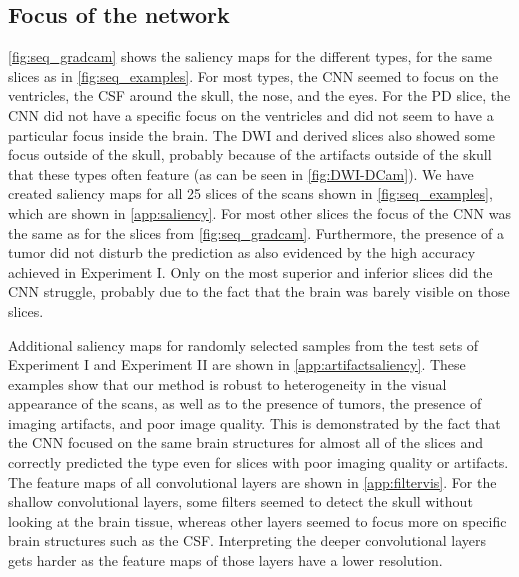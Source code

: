 \subsection{Focus of the network}
\cref{fig:seq_gradcam} shows the saliency maps for the different \glspl{type}, for the same \glspl{slice} as in \cref{fig:seq_examples}.
For most \glspl{type}, the \gls{CNN} seemed to focus on the ventricles, the \gls{CSF} around the skull, the nose, and the eyes.
For the \gls{PD} \gls{slice}, the \gls{CNN} did not have a specific focus on the ventricles and did not seem to have a particular focus inside the brain.
The \gls{DWI} and derived \glspl{slice} also showed some focus outside of the skull, probably because of the artifacts outside of the skull that these \glspl{type} often feature (as can be seen in \cref{fig:DWI-DCam}).
We have created saliency maps for all 25 \glspl{slice} of the \glspl{scan} shown in \cref{fig:seq_examples}, which are shown in \cref{app:saliency}.
For most other \glspl{slice} the focus of the \gls{CNN} was the same as for the \glspl{slice} from \cref{fig:seq_gradcam}.
Furthermore, the presence of a \gls{tumor} did not disturb the prediction as also evidenced by the high accuracy achieved in Experiment I.
Only on the most superior and inferior \glspl{slice} did the \gls{CNN} struggle, probably due to the fact that the brain was barely visible on those \glspl{slice}.

Additional saliency maps for randomly selected \glspl{sample} from the test sets of Experiment I and Experiment II are shown in \cref{app:artifactsaliency}.
These examples show that our method is robust to heterogeneity in the visual appearance of the \glspl{scan}, as well as to the presence of \glspl{tumor}, the presence of imaging artifacts, and poor image quality.
This is demonstrated by the fact that the \gls{CNN} focused on the same brain structures for almost all of the \glspl{slice} and correctly predicted the \gls{type} even for \glspl{slice} with poor imaging quality or artifacts.
The feature maps of all convolutional layers are shown in \cref{app:filtervis}.
For the shallow convolutional layers, some filters seemed to detect the skull without looking at the brain tissue, whereas other layers seemed to focus more on specific brain structures such as the \gls{CSF}.
Interpreting the deeper convolutional layers gets harder as the feature maps of those layers have a lower resolution.

